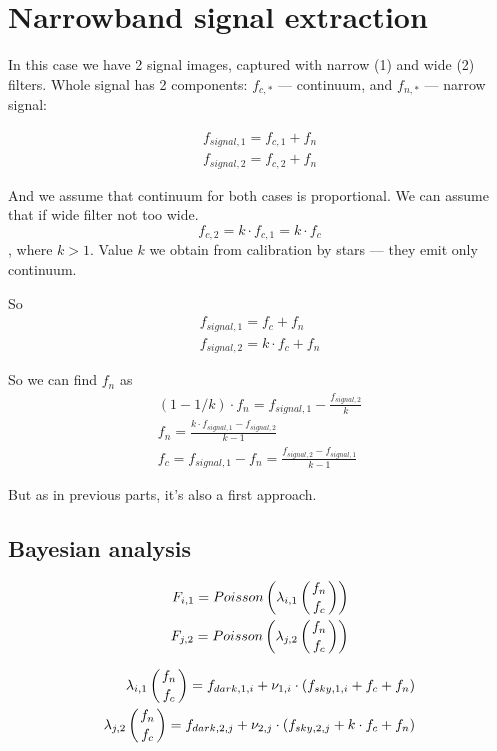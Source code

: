 \documentclass{article}
\begin{document}
\section{Narrowband signal extraction}

In this case we have 2 signal images, captured with narrow (1) and wide (2) filters. Whole signal has 2 components: $f_{c,*}$ --- continuum,
and $f_{n,*}$ --- narrow signal:

\begin{eqnarray}
    f_{signal, 1} = f_{c, 1} + f_{n} \\
    f_{signal, 2} = f_{c, 2} + f_{n}
\end{eqnarray}

And we assume that continuum for both cases is proportional. We can assume that if wide filter not too wide.
\begin{equation}
    f_{c,2} = k \cdot f_{c,1} = k \cdot f_c
\end{equation}, where $k > 1$. Value $k$ we obtain from calibration by stars --- they emit only continuum.

So
\begin{eqnarray}
    f_{signal, 1} = f_c + f_n \\
    f_{signal, 2} = k \cdot f_c + f_n
\end{eqnarray}

So we can find $f_n$ as
\begin{eqnarray}
    (1-1/k) \cdot f_n = f_{signal, 1} - \frac{f_{signal, 2}}{k} \\
    f_n = \frac{k \cdot f_{signal, 1} - f_{signal, 2}}{k-1} \\
    f_c = f_{signal,1} - f_n = \frac{f_{signal, 2} - f_{signal, 1}}{k-1}
\end{eqnarray}

But as in previous parts, it's also a first approach.

\subsection{Bayesian analysis}

\begin{eqnarray}
    F_{i,1} = Poisson\left( \lambda_{i,1}\left({f_n \atop f_c}\right) \right) \\
    F_{j,2} = Poisson\left( \lambda_{j,2}\left({f_n \atop f_c}\right) \right)
\end{eqnarray}

\begin{eqnarray}
    \lambda_{i,1}\left({f_n \atop f_c}\right) = f_{dark, 1, i} + \nu_{1,i} \cdot \left( f_{sky, 1, i} + f_c + f_n \right) \\
    \lambda_{j,2}\left({f_n \atop f_c}\right) = f_{dark, 2, j} + \nu_{2,j} \cdot \left( f_{sky, 2, j} + k \cdot f_c + f_n \right)
\end{eqnarray}
\end{document}
